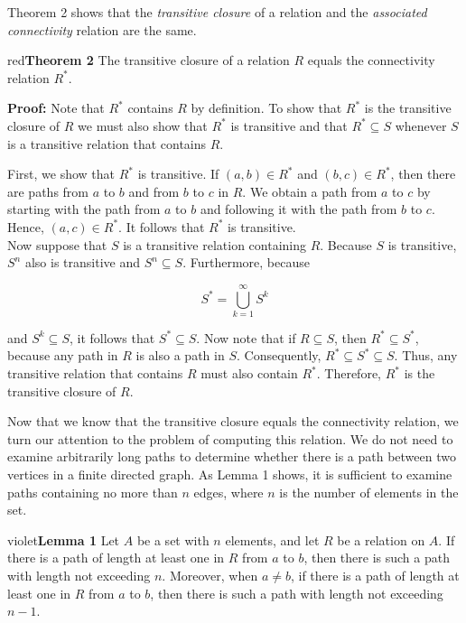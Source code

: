 \documentclass[11pt]{article}
\newenvironment{theorem}[1]{\begin{mybox}{red}{\textbf{Theorem #1}}}{\end{mybox}}
\begin{document}
Theorem 2 shows that the \textit{transitive closure} of a relation and the \textit{associated connectivity} relation are the same.

\begin{theorem}{2}
The transitive closure of a relation $R$ equals the connectivity relation $R^*$.
\end{theorem}

\textbf{Proof:} Note that $R^*$ contains $R$ by definition. To show that $R^*$ is the transitive closure of $R$ we must also show that $R^*$ is transitive and that $R^* \subseteq S$ whenever $S$ is a transitive relation that contains $R$.

First, we show that $R^*$ is transitive. If $(a, b) \in R^*$ and $(b, c) \in R^*$, then there are paths from $a$ to $b$ and from $b$ to $c$ in $R$. We obtain a path from $a$ to $c$ by starting with the path from $a$ to $b$ and following it with the path from $b$ to $c$. Hence, $(a, c) \in R^*$. It follows that $R^*$ is transitive.\\

Now suppose that $S$ is a transitive relation containing $R$. Because $S$ is transitive, $S^n$ also is transitive and $S^n \subseteq S$. Furthermore, because

\begin{equation*}
    S^* = \bigcup^{\infty}_{k=1} S^k
\end{equation*}

\noindent and $S^k \subseteq S$, it follows that $S^* \subseteq S$. Now note that if $R \subseteq S$, then $R^* \subseteq S^*$, because any path in $R$ is also a path in $S$. Consequently, $R^* \subseteq S^* \subseteq S$. Thus, any transitive relation that contains $R$ must also contain $R^*$. Therefore, $R^*$ is the transitive closure of $R$.

Now that we know that the transitive closure equals the connectivity relation, we turn our attention to the problem of computing this relation. We do not need to examine arbitrarily long paths to determine whether there is a path between two vertices in a finite directed graph. As Lemma 1 shows, it is sufficient to examine paths containing no more than $n$ edges, where $n$ is the number of elements in the set.

\newpage
\begin{mybox}{violet}{\textbf{Lemma 1}}
Let $A$ be a set with $n$ elements, and let $R$ be a relation on $A$. If there is a path of length at least one in $R$ from $a$ to $b$, then there is such a path with length not exceeding $n$. Moreover, when $a \neq b$, if there is a path of length at least one in $R$ from $a$ to $b$, then there is such a path with length not exceeding $n - 1$.
\end{mybox}
\end{document}
